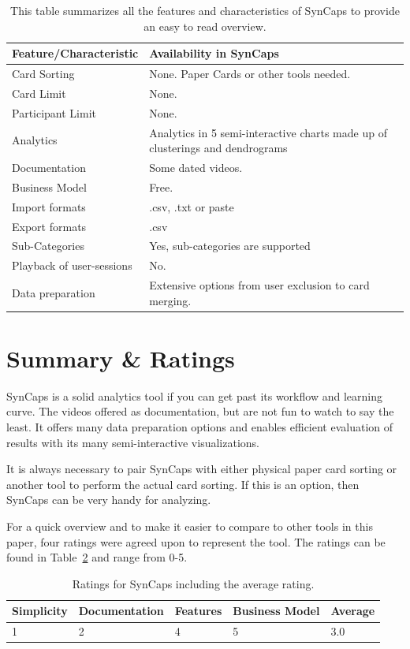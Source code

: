 \begin{table}[tp]
\centering
\begin{tabularx}
{\linewidth}{|l|X|}
\hline \textbf{Feature/Characteristic} & \textbf{Availability in SynCaps} \\ 
\hline Card Sorting & None. Paper Cards or other tools needed. \\ 
\hline Card Limit & None. \\
\hline Participant Limit & None. \\
\hline Analytics & Analytics in 5 semi-interactive
charts made up of clusterings and dendrograms \\ 
\hline Documentation & Some dated videos. \\
\hline Business Model & Free. \\
\hline Import formats & .csv, .txt or paste\\ 
\hline Export formats & .csv \\ 
\hline Sub-Categories & Yes, sub-categories are supported \\ 
\hline Playback of user-sessions & No. \\ 
\hline Data preparation & Extensive options from user exclusion to
card merging. \\ 
\hline
\end{tabularx} 
\caption[Feature summary of SynCaps] 
{ 
This table summarizes all the features and characteristics of SynCaps
to provide an easy to read overview.
}
\label{tab:features-SynCaps}
\end{table}


\section{Summary \& Ratings} SynCaps is a solid analytics tool if you
can get past its workflow and learning curve. The videos offered as
documentation, but are not fun to watch to say the least. It offers
many data preparation options and enables efficient evaluation of
results with its many semi-interactive  visualizations.

It is always necessary to pair SynCaps with either physical paper card
sorting or another tool to perform the actual card sorting. If this is
an option, then SynCaps can be very handy for analyzing.

For a quick overview and to make it easier to compare to other tools
in this paper, four ratings were agreed upon to represent the tool. The ratings can be
found in Table~\ref{tab:rating-SynCaps} and range from 0-5.

\begin{table}[tp] 
\centering 
\begin{tabularx}{\linewidth}{|X|X|X|X|X|}
\hline
Simplicity & Documentation & Features & Business Model & Average \\ 
\hline 
1 & 2 & 4 & 5 & 3.0 \\ 
\hline 
\end{tabularx} 
\caption[Ratings for SynCaps] {
Ratings for SynCaps including the average rating.
} 
\label{tab:rating-SynCaps}
\end{table}